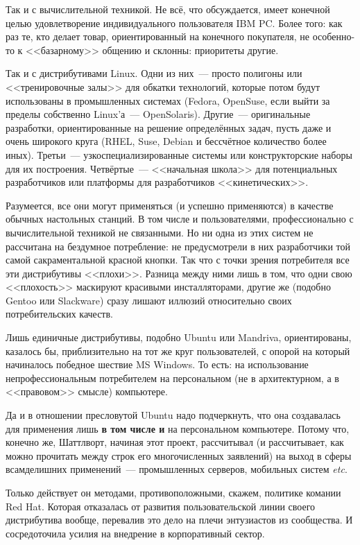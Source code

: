 Так и с вычислительной техникой. Не всё, что обсуждается, имеет конечной целью удовлетворение индивидуального пользователя IBM PC. Более того: как раз те, кто делает товар, ориентированный на конечного покупателя, не особенно-то к <<базарному>> общению и склонны: приоритеты другие.

Так и с дистрибутивами Linux. Одни из них~--- просто полигоны или <<тренировочные залы>> для обкатки технологий, которые потом будут использованы в промышленных системах (Fedora, OpenSuse, если выйти за пределы собственно Linux'а~--- OpenSolaris). Другие~--- оригинальные разработки, ориентированные на решение определённых задач, пусть даже и очень широкого круга (RHEL, Suse, Debian и бессчётное количество более иных). Третьи~--- узкоспециализированные системы или конструкторские наборы для их построения. Четвёртые~--- <<начальная школа>> для потенциальных разработчиков или платформы для разработчиков <<кинетических>>.

Разумеется, все они могут применяться (и успешно применяются) в качестве обычных настольных станций. В том числе и пользователями, профессионально с вычислительной техникой не связанными. Но ни одна из этих систем не рассчитана на бездумное потребление: не предусмотрели в них разработчики той самой сакраментальной красной кнопки. Так что с точки зрения потребителя все эти дистрибутивы <<плохи>>. Разница между ними лишь в том, что одни свою <<плохость>> маскируют красивыми инсталляторами, другие же (подобно Gentoo или Slackware) сразу лишают иллюзий относительно своих потребительских качеств.

Лишь единичные дистрибутивы, подобно Ubuntu или Mandriva, ориентированы, казалось бы, приблизительно на тот же круг пользователей, с опорой на который начиналось победное шествие MS Windows. То есть: на использование непрофессиональным потребителем на персональном (не в архитектурном, а в <<правовом>> смысле) компьютере.

Да и в отношении пресловутой Ubuntu надо подчеркнуть, что она создавалась для применения лишь \textbf{в том числе и} на персональном компьютере. Потому что, конечно же, Шаттлворт, начиная этот проект, рассчитывал (и рассчитывает, как можно прочитать между строк его многочисленных заявлений) на выход в сферы всамделишних применений~--- промышленных серверов, мобильных систем \textit{etc}.

Только действует он методами, противоположными, скажем, политике комании Red Hat. Которая отказалась от развития пользовательской линии своего дистрибутива вообще, перевалив это дело на плечи энтузиастов из сообщества. И сосредоточила усилия на внедрение в корпоративный сектор.

